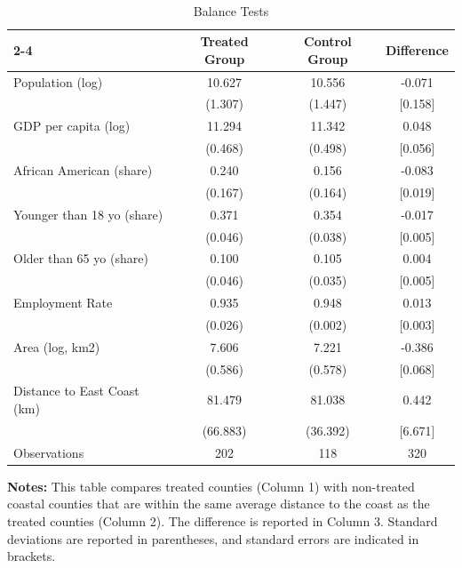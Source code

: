 \documentclass{article}
\begin{document}
\begin{table}[b!]
\begin{center}
\caption{\sc Balance Tests}\\\vspace{.25cm}
\begin{tabular}{l|ccc|}
\cline{2-4}
 & Treated Group & Control Group & Difference \\ \hline
\multicolumn{1}{|l|}{Population (log)} & 10.627 & 10.556 & -0.071 \\
\multicolumn{1}{|l|}{} & (1.307) & (1.447) & {[}0.158{]} \\
\multicolumn{1}{|l|}{GDP per capita (log)} & 11.294 & 11.342 & 0.048 \\
\multicolumn{1}{|l|}{} & (0.468) & (0.498) & {[}0.056{]} \\
\multicolumn{1}{|l|}{African American (share)} & 0.240 & 0.156 & -0.083 \\
\multicolumn{1}{|l|}{} & (0.167) & (0.164) & {[}0.019{]} \\
\multicolumn{1}{|l|}{Younger than 18 yo (share)} & 0.371 & 0.354 & -0.017 \\
\multicolumn{1}{|l|}{} & (0.046) & (0.038) & {[}0.005{]} \\
\multicolumn{1}{|l|}{Older than 65 yo (share)} & 0.100 & 0.105 & 0.004 \\
\multicolumn{1}{|l|}{} & (0.046) & (0.035) & {[}0.005{]} \\
\multicolumn{1}{|l|}{Employment Rate} & 0.935 & 0.948 & 0.013 \\
\multicolumn{1}{|l|}{} & (0.026) & (0.002) & {[}0.003{]} \\
\multicolumn{1}{|l|}{Area (log, km2)} & 7.606 & 7.221 & -0.386 \\
\multicolumn{1}{|l|}{} & (0.586) & (0.578) & {[}0.068{]} \\
\multicolumn{1}{|l|}{Distance to East Coast (km)} & 81.479 & 81.038 & 0.442 \\
\multicolumn{1}{|l|}{} & (66.883) & (36.392) & {[}6.671{]} \\ \hline
\multicolumn{1}{|l|}{Observations} & 202 & 118 & 320 \\ \hline
\end{tabular}
\end{center}
\footnotesize{\textbf{Notes:} This table compares treated counties (Column 1) with non-treated coastal counties that are within the same average distance to the coast as the treated counties (Column 2). The difference is reported in Column 3. Standard deviations are reported in parentheses, and standard errors are indicated in brackets. \par \vspace{3cm}} 
\end{table}
\end{document}
